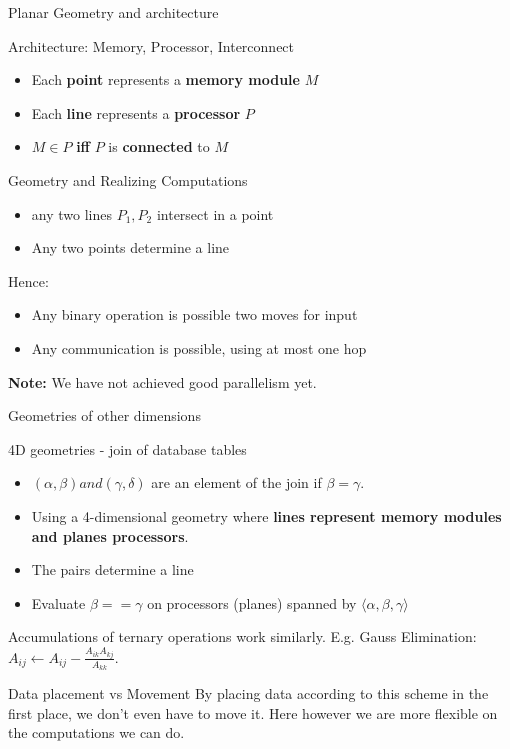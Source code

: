 \documentclass{beamer}
\begin{document}
\begin{frame}{Planar Geometry and architecture}

\begin{block}{Architecture: Memory, Processor, Interconnect}
  \begin{itemize}
  \item Each {\bf point} represents a {\bf memory module} $M$
  \item Each {\bf line} represents a {\bf processor} $P$
  \item $M \in P$ {\bf iff}  $P$ is {\bf connected} to $M$
  \end{itemize}
\end{block}

\begin{block}{Geometry and Realizing Computations}
\begin{itemize}
  \item any two lines $P_1, P_2$ intersect in a point
  \item Any two points determine a line
\end{itemize}
Hence:
\begin{itemize}
    \item Any binary operation is possible two moves for input
    \item Any communication is possible, using at most one hop
\end{itemize}
{\bf Note:} We have not achieved good parallelism yet.
\end{block}
\end{frame}


\begin{frame}{Geometries of other dimensions}
\begin{block}{4D geometries - join of database tables}
\begin{itemize}
\item $(\alpha, \beta) and (\gamma, \delta)$ are an element of the join if $\beta = \gamma$.
\item Using a 4-dimensional geometry where {\bf lines represent memory modules and planes processors}.
\item The pairs determine a line 
\item Evaluate $\beta == \gamma$ on processors (planes) spanned by $\langle \alpha, \beta, \gamma \rangle$
\end{itemize}
Accumulations of ternary operations work similarly.  E.g. Gauss Elimination: $A_{ij} \leftarrow A_{ij} - \frac{A_{ik}A_{kj}}{A_{kk}}$.
\end{block}

\begin{alertblock}{Data placement vs Movement}
By placing data according to this scheme in the first place, we don't even have to move it. Here however we are more flexible on the computations we can do.
\end{alertblock}
\end{frame}
\end{document}
